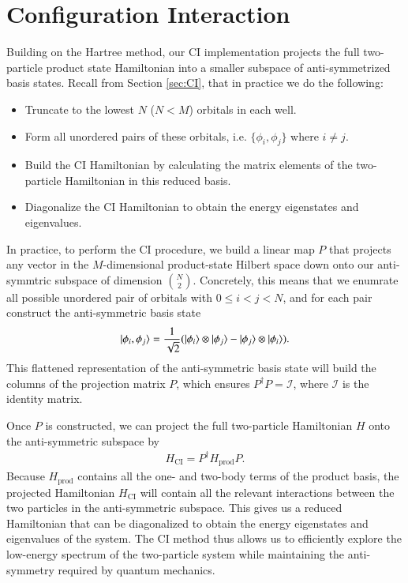 \documentclass{subfiles}
\begin{document}
\section{Configuration Interaction}\label{sec:CI_method}
Building on the Hartree method, our CI implementation projects the full two-particle product state Hamiltonian into a smaller subspace of anti-symmetrized basis states. Recall from Section \ref{sec:CI}, that in practice we do the following:
\begin{itemize}
    \item Truncate to the lowest $N$ ($N<M$) orbitals in each well.
    \item Form all unordered pairs of these orbitals, i.e. $\{\phi_i, \phi_j\}$ where $i \neq j$.
    \item Build the CI Hamiltonian by calculating the matrix elements of the two-particle Hamiltonian in this reduced basis.
    \item Diagonalize the CI Hamiltonian to obtain the energy eigenstates and eigenvalues.
\end{itemize}
In practice, to perform the CI procedure, we build a linear map $P$ that projects any vector in the $M$-dimensional product-state Hilbert space down onto our anti-symmtric subspace of dimension $\binom{N}{2}$. Concretely, this means that we enumrate all possible unordered pair of orbitals with $0\leq i < j < N$, and for each pair construct the anti-symmetric basis state
\begin{align*}
    \ket{\phi_i, \phi_j} = \frac{1}{\sqrt{2}}(\ket{\phi_i}\otimes\ket{\phi_j} - \ket{\phi_j}\otimes\ket{\phi_i}).
\end{align*}
This flattened representation of the anti-symmetric basis state will build the columns of the projection matrix $P$, which ensures $P^\dagger P = \mathcal{I}$, where $\mathcal{I}$ is the identity matrix. 

Once $P$ is constructed, we can project the full two-particle Hamiltonian $H$ onto the anti-symmetric subspace by
\begin{align*}
    H_{\text{CI}} = P^\dagger H_{\text{prod}} P.
\end{align*}
Because $H_{\text{prod}}$ contains all the one- and two-body terms of the product basis, the projected Hamiltonian $H_{\text{CI}}$ will contain all the relevant interactions between the two particles in the anti-symmetric subspace. This gives us a reduced Hamiltonian that can be diagonalized to obtain the energy eigenstates and eigenvalues of the system. The CI method thus allows us to efficiently explore the low-energy spectrum of the two-particle system while maintaining the anti-symmetry required by quantum mechanics. 
\end{document}
